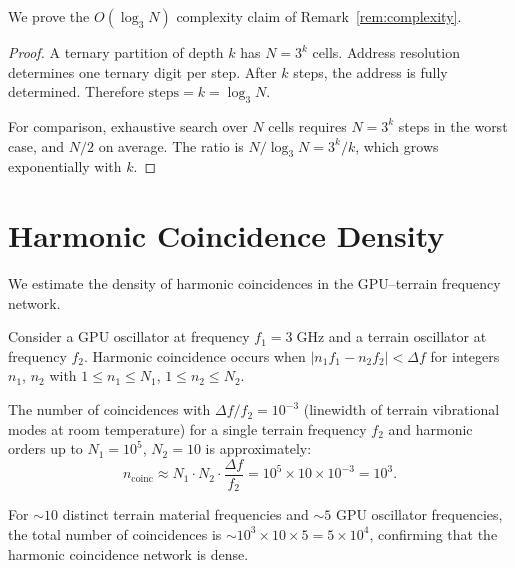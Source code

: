 \documentclass[10pt,twocolumn]{article}
\theoremstyle{definition}
\theoremstyle{remark}
\begin{document}
We prove the $O(\log_3 N)$ complexity claim of
Remark~\ref{rem:complexity}.

\begin{proof}
A ternary partition of depth $k$ has $N=3^k$ cells.  Address
resolution determines one ternary digit per step.  After $k$
steps, the address is fully determined.  Therefore
$\mathrm{steps}=k=\log_3 N$.

For comparison, exhaustive search over $N$ cells requires
$N=3^k$ steps in the worst case, and $N/2$ on average.
The ratio is
$N/\log_3 N = 3^k/k$, which grows exponentially with $k$.
\end{proof}

\section{Harmonic Coincidence Density}
\label{app:harmonic}

We estimate the density of harmonic coincidences in the
GPU--terrain frequency network.

Consider a GPU oscillator at frequency $f_1=3\;\mathrm{GHz}$
and a terrain oscillator at frequency $f_2$.  Harmonic
coincidence occurs when $|n_1 f_1 - n_2 f_2|<\Delta f$ for
integers $n_1$, $n_2$ with $1\le n_1\le N_1$,
$1\le n_2\le N_2$.

The number of coincidences with $\Delta f/f_2 = 10^{-3}$
(linewidth of terrain vibrational modes at room temperature)
for a single terrain frequency $f_2$ and harmonic orders up to
$N_1=10^5$, $N_2=10$ is approximately:
\begin{equation}
  n_{\mathrm{coinc}} \approx N_1\cdot N_2\cdot
  \frac{\Delta f}{f_2}
  = 10^5\times 10\times 10^{-3}
  = 10^3.
\end{equation}

For $\sim 10$ distinct terrain material frequencies and
$\sim 5$ GPU oscillator frequencies, the total number of
coincidences is $\sim 10^3\times 10\times 5 = 5\times 10^4$,
confirming that the harmonic coincidence network is dense.
\end{document}

